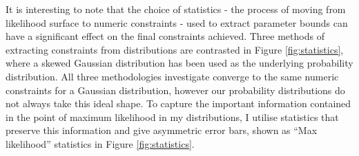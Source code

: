 \documentclass[titlesmallcaps, examinerscopy, copyrightpage]{uqthesis}
\begin{document}
It is interesting to note that the choice of statistics - the process of moving from likelihood surface to numeric constraints - used to extract parameter bounds can have a significant effect on the final constraints achieved. Three methods of extracting constraints from distributions are contrasted in Figure \ref{fig:statistics}, where a skewed Gaussian distribution has been used as the underlying probability distribution. All three methodologies investigate converge to the same numeric constraints for a Gaussian distribution, however our probability distributions do not always take this ideal shape. To capture the important information contained in the point of maximum likelihood in my distributions, I utilise statistics that preserve this information and give asymmetric error bars, shown as ``Max likelihood'' statistics in Figure \ref{fig:statistics}.
\end{document}
